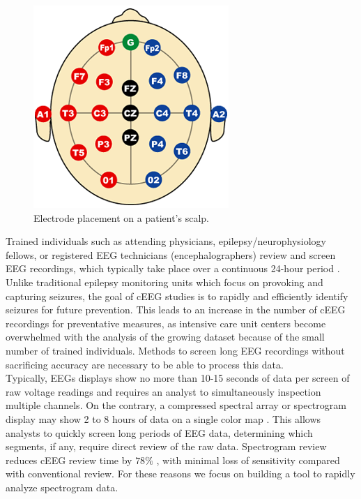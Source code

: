 \begin{figure}[h]
\begin{center}
\includegraphics[scale=0.5]{./img/electrodes.png}
\caption{Electrode placement on a patient's scalp.}
\label{fig:electrodes}
\end{center}
\end{figure}

Trained individuals such as attending physicians, epilepsy/neurophysiology
fellows, or registered EEG technicians (encephalographers) review and screen
EEG recordings, which typically take place over a continuous 24-hour period
\cite{ceeg-3}.  Unlike traditional epilepsy monitoring units which focus on
provoking and capturing seizures, the goal of cEEG studies is to rapidly and
efficiently identify seizures for future prevention. This leads to an increase
in the number of cEEG recordings for preventative measures, as intensive care
unit centers become overwhelmed with the analysis of the growing dataset
because of the small number of trained individuals. Methods to screen long EEG
recordings without sacrificing accuracy are necessary to be able to process
this data. \\

Typically, EEGs displays show no more than 10-15 seconds of data per screen of
raw voltage readings and requires an analyst to simultaneously inspection
multiple channels. On the contrary, a compressed spectral array \cite{csa} or
spectrogram display may show 2 to 8 hours of data on a single color map
\cite{ceeg-3}. This allows analysts to quickly screen long periods of EEG data,
determining which segments, if any, require direct review of the raw data.
Spectrogram review reduces cEEG review time by $78\%$ \cite{ceeg-2}, with
minimal loss of sensitivity compared with conventional review. For these
reasons we focus on building a tool to rapidly analyze spectrogram data. \\


